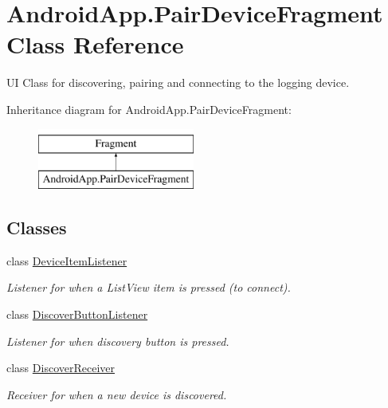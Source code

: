 \hypertarget{class_android_app_1_1_pair_device_fragment}{}\section{Android\+App.\+Pair\+Device\+Fragment Class Reference}
\label{class_android_app_1_1_pair_device_fragment}


UI Class for discovering, pairing and connecting to the logging device.  


Inheritance diagram for Android\+App.\+Pair\+Device\+Fragment\+:\begin{figure}[H]
\begin{center}
\leavevmode
\includegraphics[height=2.000000cm]{class_android_app_1_1_pair_device_fragment}
\end{center}
\end{figure}
\subsection*{Classes}
\begin{DoxyCompactItemize}
\item 
class \hyperlink{class_android_app_1_1_pair_device_fragment_1_1_device_item_listener}{Device\+Item\+Listener}
\begin{DoxyCompactList}\small\item\em Listener for when a List\+View item is pressed (to connect). \end{DoxyCompactList}\item 
class \hyperlink{class_android_app_1_1_pair_device_fragment_1_1_discover_button_listener}{Discover\+Button\+Listener}
\begin{DoxyCompactList}\small\item\em Listener for when discovery button is pressed. \end{DoxyCompactList}\item 
class \hyperlink{class_android_app_1_1_pair_device_fragment_1_1_discover_receiver}{Discover\+Receiver}
\begin{DoxyCompactList}\small\item\em Receiver for when a new device is discovered. \end{DoxyCompactList}\end{DoxyCompactItemize}
